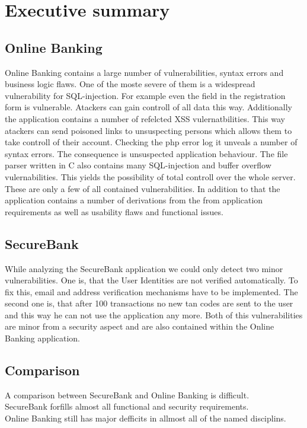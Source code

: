 \chapter{Executive summary}
\section*{Online Banking}
Online Banking contains a large number of vulnerabilities, syntax errors and business logic flaws.
One of the moste severe of them is a widespread vulnerability for SQL-injection. For example even the field  in the registration form is vulnerable. Atackers can gain controll of all data this way.
Additionally the application contains a number of refelcted XSS vulernatbilities. This way atackers can send poisoned links to unsuspecting persons which allows them to take controll of their account.
Checking the php error log it unveals a number of syntax errors. The consequence is unsuspected application behaviour.
The file parser written in C also contains many SQL-injection and buffer overflow vulernabilities. This yields the possibility of total controll over the whole server.\\
These are only a few of all contained vulnerabilities.
In addition to that the application contains a number of derivations from the from application requirements as well as usability flaws and functional issues.


\section*{SecureBank}
While analyzing the SecureBank application we could only detect two minor vulnerabilities.
One is, that the User Identities are not verified automatically. To fix this, email and address verification mechanisms have to be implemented.
The second one is, that after 100 transactions no new tan codes are sent to the user and this way he can not use the application any more.
Both of this vulnerabilities are minor from a security aspect and are also contained within the Online Banking application.

\section*{Comparison}
A comparison between SecureBank and Online Banking is difficult.\\
SecureBank forfills almost all functional and security requirements.\\
Online Banking still has major defficits in allmost all of the named disciplins.

